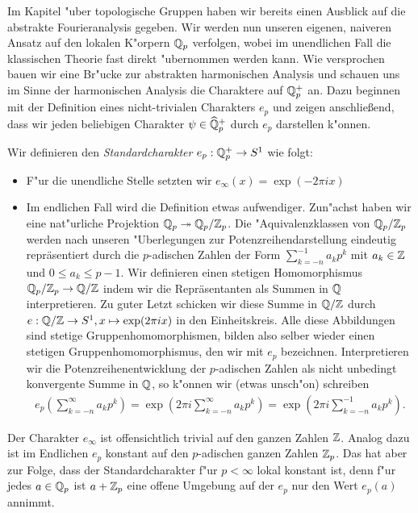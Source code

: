 		Im Kapitel "uber topologische Gruppen haben wir bereits einen Ausblick auf die abstrakte Fourieranalysis gegeben.
		Wir werden nun unseren eigenen, naiveren Ansatz auf den lokalen K"orpern ${\mathbb{Q}_p}$ verfolgen, wobei im unendlichen Fall die klassischen Theorie fast direkt "ubernommen werden kann.
		Wie versprochen bauen wir eine Br"ucke zur abstrakten harmonischen Analysis und schauen uns im Sinne der harmonischen Analysis die Charaktere auf $\mathbb{Q}_p^+$ an.
		Dazu beginnen mit der Definition eines nicht-trivialen Charakters $e_p$ und zeigen anschließend, dass wir jeden beliebigen Charakter $\psi \in \widehat{\mathbb{Q}}_p^+$ durch $e_p$ darstellen k"onnen.
		\begin{defi}
			Wir definieren den \emph{Standardcharakter} $e_p:\mathbb{Q}_p^+ \to S^1$ wie folgt:
			\begin{itemize}%
				\item F"ur die unendliche Stelle setzten wir $e_\infty(x) = \exp(-2\pi i x)$
				\item Im endlichen Fall wird die Definition etwas aufwendiger. Zun"achst haben wir eine nat"urliche Projektion ${\mathbb{Q}_p} \twoheadrightarrow {\mathbb{Q}_p}/{\mathbb{Z}_p}$.
				Die "Aquivalenzklassen von ${\mathbb{Q}_p}/{\mathbb{Z}_p}$ werden nach unseren "Uberlegungen zur Potenzreihendarstellung eindeutig repräsentiert durch die $p$-adischen Zahlen der Form $\sum_{k=-n}^{-1} a_kp^k$ mit $a_k \in \mathbb{Z}$ und $0\leq a_k\leq p-1$.
				Wir definieren einen stetigen Homomorphismus ${\mathbb{Q}_p}/{\mathbb{Z}_p} \to \mathbb{Q}/\mathbb{Z}$ indem wir die Repräsentanten als Summen in $\mathbb{Q}$ interpretieren. 
				Zu guter Letzt schicken wir diese Summe in $\mathbb{Q}/\mathbb{Z}$ durch $e: \mathbb{Q}/\mathbb{Z} \to S^1, x \mapsto \exp(2\pi i x)$ in den Einheitskreis. 
				Alle diese Abbildungen sind stetige Gruppenhomomorphismen, bilden also selber wieder einen stetigen Gruppenhomomorphismus, den wir mit $e_p$ bezeichnen.
				Interpretieren wir die Potenzreihenentwicklung der $p$-adischen Zahlen als nicht unbedingt konvergente Summe in $\mathbb{Q}$, so k"onnen wir (etwas unsch"on) schreiben
				\begin{align*}
					e_p\left(\sum_{k=-n}^{\infty} a_kp^k\right) = \exp\left(2\pi i \sum_{k=-n}^{\infty} a_kp^k\right) = \exp\left(2\pi i \sum_{k=-n}^{-1} a_kp^k\right).
				\end{align*}
			\end{itemize}
		\end{defi}
		Der Charakter $e_\infty$ ist offensichtlich trivial auf den ganzen Zahlen $\mathbb{Z}$.
		Analog dazu ist im Endlichen $e_p$ konstant auf den $p$-adischen ganzen Zahlen ${\mathbb{Z}_p}$.
		Das hat aber zur Folge, dass der Standardcharakter f"ur $p<\infty$ lokal konstant ist, denn f"ur jedes $a \in {\mathbb{Q}_p}$ ist $a+{\mathbb{Z}_p}$ eine offene Umgebung auf der $e_p$ nur den Wert $e_p(a)$ annimmt.
		
